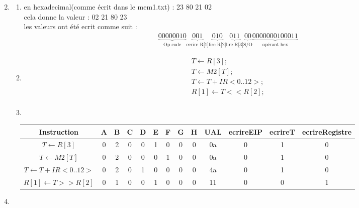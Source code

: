 \documentclass{article}
\begin{document}
\newpage
\begin{enumerate}
	\setcounter{enumi}{1}
	\item
	      \begin{enumerate}[label=\alph*)]
	      	\item en hexadecimal(comme \'ecrit dans le mem1.txt) : 23 80 21 02 \\
	      	      cela donne la valeur : 02 21 80 23\\
	      	      les valeurs ont \'et\'e ecrit comme suit :
	      	      \begin{align*}
	      	      	\underbrace{0000 0010}_{\mbox{Op code}}
	      	      	\underbrace{001}_{\mbox{ecrire R[1]}}
	      	      	\underbrace{010}_{\mbox{lire R[2]}}
	      	      	\underbrace{011}_{\mbox{lire R[3]}}
	      	      	\underbrace{00}_{\mbox{S/O}}
	      	      	\underbrace{0 0000 0010 0011}_{\mbox{op\'erant hex}}
	      	      \end{align*}
	      	\item
	      	      \begin{align*}
	      	      	T \leftarrow R[3];          \\
	      	      	T \leftarrow M2[T];         \\
	      	      	T \leftarrow T + IR<0..12>; \\
	      	      	R[1] \leftarrow T << R[2];  \\
	      	      \end{align*}
	      	\item
	      \end{enumerate}
\end{enumerate}
\begin{figure}[h]
	\begin{tabular}{*{13}{|c} |}
		\hline
		Instruction                  & A & B & C & D & E & F & G & H & UAL & ecrireEIP & ecrireT & ecrireRegistre \\ \hline
		$T \leftarrow R[3]$          & 0 & 2 & 0 & 0 & 1 & 0 & 0 & 0 & 0a  & 0         & 1       & 0              \\ \hline
		$T \leftarrow M2[T]$         & 0 & 2 & 0 & 0 & 0 & 1 & 0 & 0 & 0a  & 0         & 1       & 0              \\ \hline
		$T \leftarrow T + IR<0..12>$ & 0 & 2 & 0 & 1 & 0 & 0 & 0 & 0 & 4a  & 0         & 1       & 0              \\ \hline
		$R[1] \leftarrow T >> R[2]$  & 0 & 1 & 0 & 0 & 1 & 0 & 0 & 0 & 11  & 0         & 0       & 1              \\ \hline
	\end{tabular}
\end{figure}
\newpage
\begin{enumerate}
	\begin{enumerate}[label=\alph*)]
		\setcounter{enumii}{3}
		\item
	\end{enumerate}
\end{enumerate}
\end{document}
